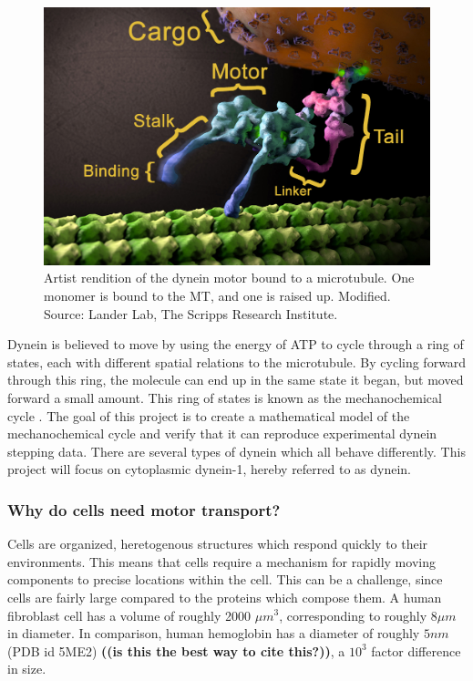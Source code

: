 \documentclass[10pt]{article} %
\begin{document}
\begin{figure}[h]
  \centering
  \includegraphics[width=.65\textwidth,keepaspectratio]{../../figures/dynein-artist-rendition.jpg}
  \caption{Artist rendition of the dynein motor bound to a microtubule. One monomer is bound to the MT, and one is raised up. Modified. Source: Lander Lab, The Scripps Research Institute.}
  \label{dynein-artist-rendition}
\end{figure}

Dynein is believed to move by using the energy of ATP to cycle through a ring of states, each with different spatial relations to the microtubule. By cycling forward through this ring, the molecule can end up in the same state it began, but moved forward a small amount. This ring of states is known as the mechanochemical cycle \cite{cianfroccoreview}. The goal of this project is to create a mathematical model of the mechanochemical cycle and verify that it can reproduce experimental dynein stepping data. There are several types of dynein which all behave differently. This project will focus on cytoplasmic dynein-1, hereby referred to as dynein.\\

\subsubsection{Why do cells need motor transport?}
Cells are organized, heretogenous structures which respond quickly to their environments. This means that cells require a mechanism for rapidly moving components to precise locations within the cell. This can be a challenge, since cells are fairly large compared to the proteins which compose them. A human fibroblast cell has a volume of roughly 2000 $\mu m^3$\cite{fibroblastvolume}, corresponding to roughly $8 \mu m$ in diameter. In comparison, human hemoglobin has a diameter of roughly $5 nm$ (PDB id 5ME2) \textbf{((is this the best way to cite this?))}, a $10^3$ factor difference in size.\\
\end{document}
